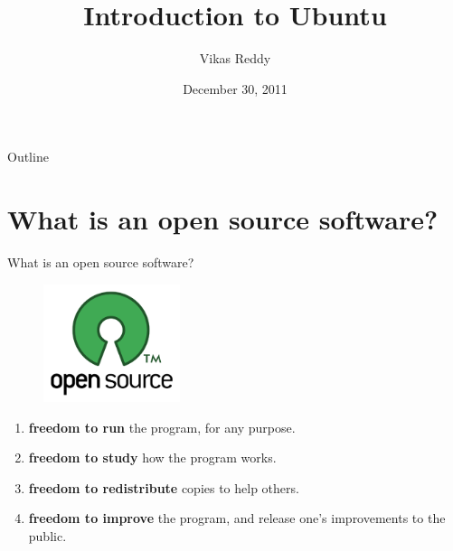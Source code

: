 \documentclass{beamer}
\title{Introduction to Ubuntu}
\author{Vikas Reddy}
\institute[Azri]{Azri Solutions}
\date{December 30, 2011}
\begin{document}
 \begin{frame}
  \titlepage
 \end{frame}

 \begin{frame}{Outline}
  \tableofcontents
 \end{frame}

 \section{What is an open source software?}
 \begin{frame}{What is an open source software?}
  \begin{figure}
    \includegraphics[width=4cm]{Images/opensource-logo}
  \end{figure}
  \begin{enumerate}
   \pause
   \item \textbf{freedom to run} the program, for any purpose.
   \pause
   \item \textbf{freedom to study} how the program works.
   \pause
   \item \textbf{freedom to redistribute} copies to help others.
   \pause
   \item \textbf{freedom to improve} the program, and release one's improvements to the public.
  \end{enumerate}
 \end{frame}
\end{document}
